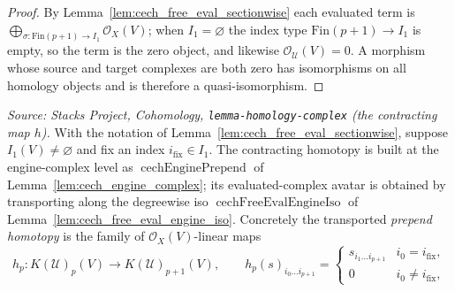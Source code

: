 \begin{proof}
  By Lemma~\ref{lem:cech_free_eval_sectionwise} each evaluated term is
  \(\bigoplus_{\sigma : \mathrm{Fin}(p+1) \to I_1} \mathcal{O}_X(V)\); when
  \(I_1 = \varnothing\) the index type \(\mathrm{Fin}(p+1) \to I_1\) is empty, so the
  term is the zero object, and likewise \(\mathcal{O}_{\mathcal{U}}(V) = 0\). A
  morphism whose source and target complexes are both zero has isomorphisms on all
  homology objects and is therefore a quasi-isomorphism.
\end{proof}

\begin{lemma}
  \label{lem:cech_free_eval_prepend_homotopy}
  \textit{Source: Stacks Project, Cohomology, \texttt{lemma-homology-complex}
  (the contracting map \(h\)).}
  With the notation of Lemma~\ref{lem:cech_free_eval_sectionwise}, suppose
  \(I_1(V) \neq \varnothing\) and fix an index \(i_{\mathrm{fix}} \in I_1\). The
  contracting homotopy is built at the engine-complex level as
  \(\operatorname{cechEnginePrepend}\) of Lemma~\ref{lem:cech_engine_complex}; its
  evaluated-complex avatar is obtained by transporting along the degreewise iso
  \(\operatorname{cechFreeEvalEngineIso}\) of
  Lemma~\ref{lem:cech_free_eval_engine_iso}. Concretely the transported
  \emph{prepend homotopy} is the family of \(\mathcal{O}_X(V)\)-linear maps
  \[
    h_p : K(\mathcal{U})_p(V) \longrightarrow K(\mathcal{U})_{p+1}(V),
    \qquad
    h_p(s)_{i_0 \ldots i_{p+1}} =
      \begin{cases}
        s_{i_1 \ldots i_{p+1}} & i_0 = i_{\mathrm{fix}}, \\
        0 & i_0 \neq i_{\mathrm{fix}},

\end{cases}\]
\end{lemma}
